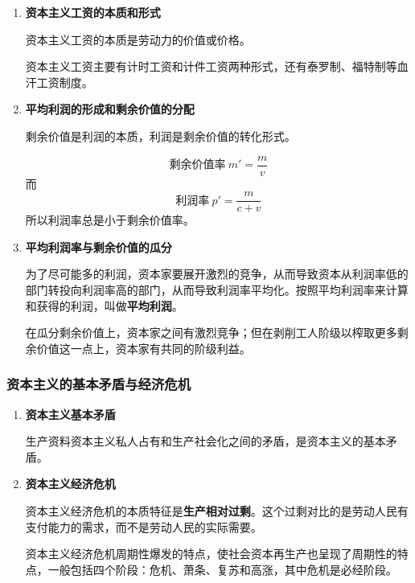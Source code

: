\documentclass[12pt, a4paper, oneside]{ctexart}
\begin{document}
\begin{enumerate}
  \item {\bf 资本主义工资的本质和形式}
  
  资本主义工资的本质是劳动力的价值或价格。

  资本主义工资主要有计时工资和计件工资两种形式，还有泰罗制、福特制等血汗工资制度。

  \item {\bf 平均利润的形成和剩余价值的分配}
  
  剩余价值是利润的本质，利润是剩余价值的转化形式。

  \begin{equation*}
    \text{剩余价值率}\ m'=\frac{m}{v}
  \end{equation*}
  而
  \begin{equation*}
    \text{利润率}\ p'=\frac{m}{c+v}
  \end{equation*}
  所以利润率总是小于剩余价值率。

  \item {\bf 平均利润率与剩余价值的瓜分}
  
  为了尽可能多的利润，资本家要展开激烈的竞争，从而导致资本从利润率低的部门转投向利润率高的部门，从而导致利润率平均化。按照平均利润率来计算和获得的利润，叫做\textbf{平均利润}。

  在瓜分剩余价值上，资本家之间有激烈竞争；但在剥削工人阶级以榨取更多剩余价值这一点上，资本家有共同的阶级利益。

\end{enumerate}

\subsubsection{资本主义的基本矛盾与经济危机}

\begin{enumerate}
  \item {\bf 资本主义基本矛盾}
  
  生产资料资本主义私人占有和生产社会化之间的矛盾，是资本主义的基本矛盾。

  \item {\bf 资本主义经济危机}
  
  资本主义经济危机的本质特征是\textbf{生产相对过剩}。这个过剩对比的是劳动人民有支付能力的需求，而不是劳动人民的实际需要。

  资本主义经济危机周期性爆发的特点，使社会资本再生产也呈现了周期性的特点，一般包括四个阶段：危机、萧条、复苏和高涨，其中危机是必经阶段。

\end{enumerate}
\end{document}
